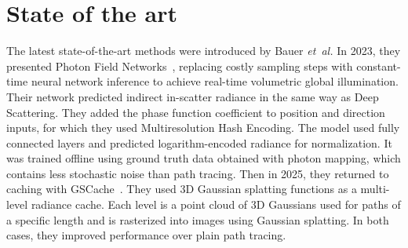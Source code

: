 \section{State of the art}

The latest state-of-the-art methods were introduced by Bauer \emph{et~al.}
In 2023, they presented Photon Field Networks~\cite{bauer_photon_2024},
replacing costly sampling steps with constant-time neural network inference to
achieve real-time volumetric global illumination. Their network predicted indirect
in-scatter radiance in the same way as Deep Scattering. They added the phase
function coefficient to position and direction inputs, for which they used
Multiresolution Hash Encoding. The model used fully connected layers and
predicted logarithm-encoded radiance for normalization. It was trained offline
using ground truth data obtained with photon mapping, which contains less
stochastic noise than path tracing. Then in 2025, they returned to caching
with GSCache~\cite{bauer_gscache_2026}. They used 3D Gaussian splatting functions
as a multi-level radiance cache. Each level is a point cloud of 3D Gaussians used
for paths of a specific length and is rasterized into images using Gaussian
splatting. In both cases, they improved performance over plain path tracing.
